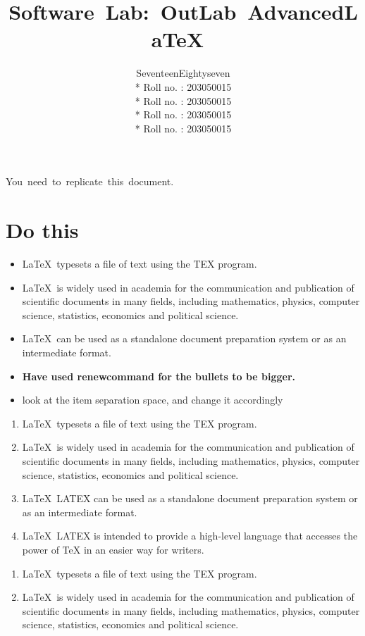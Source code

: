\documentclass{article}
\title{
    \huge{\bf \mbox{Software Lab: OutLab Advanced}\newline\LaTeX\ }
}
\author{\huge SeventeenEightyseven
    \\* Roll no. : 203050015 
    \\* Roll no. : 203050015 
    \\* Roll no. : 203050015 
    \\* Roll no. : 203050015 }
\begin{document}
    \addtolength{\topmargin}{2in}
    \maketitle
    \thispagestyle{empty}
    \clearpage
    \newpage
    \restoregeometry
    \tableofcontents
    \newpage
    \mbox{You need to replicate this document.}
    \section{Do this}\label{doThis}
        \begin{itemize}
            \item \LaTeX\ typesets a file of text using the TEX program.
            \item \LaTeX\ is widely used in academia for the communication and publication of scientific documents in many fields, including mathematics, physics, computer science, statistics, economics and political science.
            \item \LaTeX\ can be used as a standalone document preparation system or as an intermediate format.
            \item {\bf Have used renewcommand for the bullets to be bigger.}
            \item look at the item separation space, and change it accordingly
        \end{itemize}
        \begin{enumerate}[label=\roman*]
            \item \LaTeX\ typesets a file of text using the TEX program.
            \item \LaTeX\ is widely used in academia for the communication and publication of scientific documents in many fields, including mathematics, physics, computer science, statistics, economics and political science.
            \item \LaTeX\ LATEX can be used as a standalone document preparation system or as an intermediate format.
            \item \LaTeX\ LATEX is intended to provide a high-level language that accesses the power of TeX in an easier way for writers.
        \end{enumerate}
        \begin{enumerate}[label=(\alph*)]
            \item \LaTeX\ typesets a file of text using the TEX program.
            \item \LaTeX\ is widely used in academia for the communication and publication of scientific documents in many fields, including mathematics, physics, computer science, statistics, economics and political science.
        \end{enumerate}
        \newpage
\end{document}
